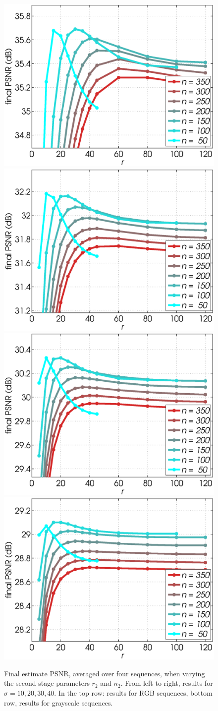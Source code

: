 \documentclass[10pt, journal, twocolumn, final, a4paper]{IEEEtran}
\begin{document}
\begin{figure}[htpb!]
\begin{center}
		\includegraphics[width=.25\textwidth]{figs/params_tables/fpsnr_r2-np2-curves_s10_average_mono_neg-weights.eps}%
		\includegraphics[width=.25\textwidth]{figs/params_tables/fpsnr_r2-np2-curves_s20_average_mono_neg-weights.eps}%
		\includegraphics[width=.25\textwidth]{figs/params_tables/fpsnr_r2-np2-curves_s30_average_mono_neg-weights.eps}%
		\includegraphics[width=.25\textwidth]{figs/params_tables/fpsnr_r2-np2-curves_s40_average_mono_neg-weights.eps}\\

	\end{center}
	\caption{Final estimate PSNR, averaged over four sequences, when varying the
		second stage parameters $r_2$ and $n_2$. From left to right, results for
		$\sigma = 10, 20, 30, 40$. In the top row: results for RGB sequences, bottom
		row, results for grayscale sequences.} 
	\label{fig:rank2-nsim2-fpsnr}
\end{figure}
\end{document}
